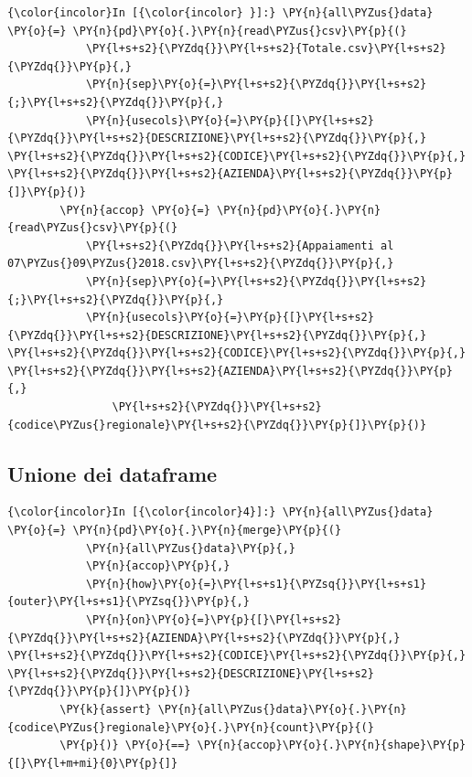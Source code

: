 \documentclass[12pt,a4paper,twoside,openright]{book}
\begin{document}
    \begin{Verbatim}[commandchars=\\\{\}]
{\color{incolor}In [{\color{incolor} }]:} \PY{n}{all\PYZus{}data} \PY{o}{=} \PY{n}{pd}\PY{o}{.}\PY{n}{read\PYZus{}csv}\PY{p}{(}
            \PY{l+s+s2}{\PYZdq{}}\PY{l+s+s2}{Totale.csv}\PY{l+s+s2}{\PYZdq{}}\PY{p}{,}
            \PY{n}{sep}\PY{o}{=}\PY{l+s+s2}{\PYZdq{}}\PY{l+s+s2}{;}\PY{l+s+s2}{\PYZdq{}}\PY{p}{,}
            \PY{n}{usecols}\PY{o}{=}\PY{p}{[}\PY{l+s+s2}{\PYZdq{}}\PY{l+s+s2}{DESCRIZIONE}\PY{l+s+s2}{\PYZdq{}}\PY{p}{,} \PY{l+s+s2}{\PYZdq{}}\PY{l+s+s2}{CODICE}\PY{l+s+s2}{\PYZdq{}}\PY{p}{,} \PY{l+s+s2}{\PYZdq{}}\PY{l+s+s2}{AZIENDA}\PY{l+s+s2}{\PYZdq{}}\PY{p}{]}\PY{p}{)}
        \PY{n}{accop} \PY{o}{=} \PY{n}{pd}\PY{o}{.}\PY{n}{read\PYZus{}csv}\PY{p}{(}
            \PY{l+s+s2}{\PYZdq{}}\PY{l+s+s2}{Appaiamenti al 07\PYZus{}09\PYZus{}2018.csv}\PY{l+s+s2}{\PYZdq{}}\PY{p}{,}
            \PY{n}{sep}\PY{o}{=}\PY{l+s+s2}{\PYZdq{}}\PY{l+s+s2}{;}\PY{l+s+s2}{\PYZdq{}}\PY{p}{,}
            \PY{n}{usecols}\PY{o}{=}\PY{p}{[}\PY{l+s+s2}{\PYZdq{}}\PY{l+s+s2}{DESCRIZIONE}\PY{l+s+s2}{\PYZdq{}}\PY{p}{,} \PY{l+s+s2}{\PYZdq{}}\PY{l+s+s2}{CODICE}\PY{l+s+s2}{\PYZdq{}}\PY{p}{,} \PY{l+s+s2}{\PYZdq{}}\PY{l+s+s2}{AZIENDA}\PY{l+s+s2}{\PYZdq{}}\PY{p}{,}
                \PY{l+s+s2}{\PYZdq{}}\PY{l+s+s2}{codice\PYZus{}regionale}\PY{l+s+s2}{\PYZdq{}}\PY{p}{]}\PY{p}{)}
\end{Verbatim}


    \hypertarget{unione-dei-dataframe}{%
\subsection{Unione dei dataframe}\label{unione-dei-dataframe}}

    \begin{Verbatim}[commandchars=\\\{\}]
{\color{incolor}In [{\color{incolor}4}]:} \PY{n}{all\PYZus{}data} \PY{o}{=} \PY{n}{pd}\PY{o}{.}\PY{n}{merge}\PY{p}{(}
            \PY{n}{all\PYZus{}data}\PY{p}{,}
            \PY{n}{accop}\PY{p}{,}
            \PY{n}{how}\PY{o}{=}\PY{l+s+s1}{\PYZsq{}}\PY{l+s+s1}{outer}\PY{l+s+s1}{\PYZsq{}}\PY{p}{,}
            \PY{n}{on}\PY{o}{=}\PY{p}{[}\PY{l+s+s2}{\PYZdq{}}\PY{l+s+s2}{AZIENDA}\PY{l+s+s2}{\PYZdq{}}\PY{p}{,} \PY{l+s+s2}{\PYZdq{}}\PY{l+s+s2}{CODICE}\PY{l+s+s2}{\PYZdq{}}\PY{p}{,} \PY{l+s+s2}{\PYZdq{}}\PY{l+s+s2}{DESCRIZIONE}\PY{l+s+s2}{\PYZdq{}}\PY{p}{]}\PY{p}{)}
        \PY{k}{assert} \PY{n}{all\PYZus{}data}\PY{o}{.}\PY{n}{codice\PYZus{}regionale}\PY{o}{.}\PY{n}{count}\PY{p}{(}
        \PY{p}{)} \PY{o}{==} \PY{n}{accop}\PY{o}{.}\PY{n}{shape}\PY{p}{[}\PY{l+m+mi}{0}\PY{p}{]}
\end{Verbatim}
\end{document}
